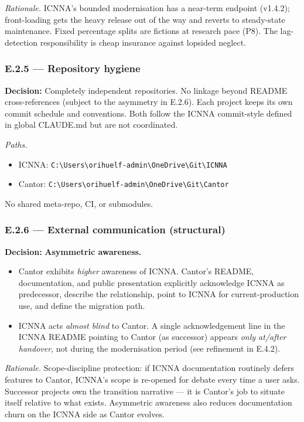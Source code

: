 \documentclass[11pt,a4paper]{article}
\begin{document}
\textit{Rationale.} ICNNA's bounded modernisation has a near-term endpoint (v1.4.2); front-loading gets the heavy release out of the way and reverts to steady-state maintenance. Fixed percentage splits are fictions at research pace (P8). The lag-detection responsibility is cheap insurance against lopsided neglect.

\subsubsection{E.2.5 --- Repository hygiene}

\textbf{Decision:} Completely independent repositories. No linkage beyond README cross-references (subject to the asymmetry in E.2.6). Each project keeps its own commit schedule and conventions. Both follow the ICNNA commit-style defined in global CLAUDE.md but are not coordinated.

\textit{Paths.}
\begin{itemize}[nosep]
    \item ICNNA: \texttt{C:\textbackslash Users\textbackslash orihuelf-admin\textbackslash OneDrive\textbackslash Git\textbackslash ICNNA}
    \item Cantor: \texttt{C:\textbackslash Users\textbackslash orihuelf-admin\textbackslash OneDrive\textbackslash Git\textbackslash Cantor}
\end{itemize}

No shared meta-repo, CI, or submodules.

\subsubsection{E.2.6 --- External communication (structural)}

\textbf{Decision:} \textbf{Asymmetric awareness.}
\begin{itemize}
    \item Cantor exhibits \emph{higher} awareness of ICNNA. Cantor's README, documentation, and public presentation explicitly acknowledge ICNNA as predecessor, describe the relationship, point to ICNNA for current-production use, and define the migration path.
    \item ICNNA acts \emph{almost blind} to Cantor. A single acknowledgement line in the ICNNA README pointing to Cantor (as successor) appears \emph{only at/after handover}, not during the modernisation period (see refinement in E.4.2).
\end{itemize}

\textit{Rationale.} Scope-discipline protection: if ICNNA documentation routinely defers features to Cantor, ICNNA's scope is re-opened for debate every time a user asks. Successor projects own the transition narrative --- it is Cantor's job to situate itself relative to what exists. Asymmetric awareness also reduces documentation churn on the ICNNA side as Cantor evolves.
\end{document}
